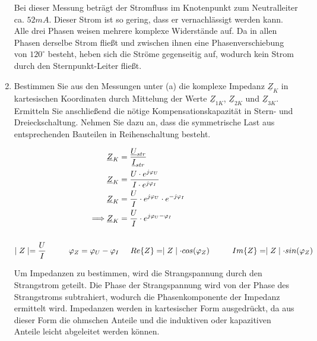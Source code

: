 \begin{enumerate}[label=\alph*)]
	 		
	 		Bei dieser Messung beträgt der Stromfluss im Knotenpunkt zum Neutralleiter ca. $52 mA$. Dieser Strom ist so gering, dass er vernachlässigt werden kann. Alle drei Phasen weisen mehrere komplexe Widerstände auf. Da in allen Phasen derselbe Strom fließt und zwischen ihnen eine Phasenverschiebung von $120^\circ$ besteht, heben sich die Ströme gegenseitig auf, wodurch kein Strom durch den Sternpunkt-Leiter fließt.
	 		
	 		\item Bestimmen Sie aus den Messungen unter (a) die komplexe Impedanz $\underline{Z}_{K}$ in kartesischen Koordinaten durch Mittelung der Werte $\underline{Z}_{1K}$, $\underline{Z}_{2K}$ und $\underline{Z}_{3K}$. Ermitteln Sie anschließend die nötige Kompensationskapazität in Stern- und Dreieckschaltung. Nehmen Sie dazu an, dass die symmetrische Last aus entsprechenden Bauteilen in Reihenschaltung besteht.
	 		
	 		\begin{align*}
	 			\underline{Z}_{K} &= \frac{\underline{U}_{str}}{\underline{I}_{str}}\\
	 			\underline{Z}_{K} &= \frac{U\cdot  e^{j\varphi_{U}}}{I\cdot  e^{j\varphi_{I}}}\\
	 			\underline{Z}_{K} &= \frac{U}{I} \cdot  e^{j\varphi_{U}}\cdot e^{-j\varphi_{I}}\\
	 			\Longrightarrow\underline{Z}_{K} &= \frac{U}{I} \cdot  e^{j{\varphi_{U} - \varphi_{I}}} \\ \ \\
	 			\mid Z \mid			= \frac{U}{I} \hspace{1cm}
	 			\varphi _{Z} 		= {\varphi_{U} - \varphi_{I}}
	 			&\hspace{0.5cm}
	 			Re\{Z\} 			= \mid Z \mid \cdot cos(\varphi_{Z}) \hspace{1cm}
	 			Im\{Z\} 			= \mid Z \mid \cdot sin(\varphi_{Z})\\
	 		\end{align*}
	 		
	 		Um Impedanzen zu bestimmen, wird die Strangspannung durch den Strangstrom geteilt. Die Phase der Strangspannung wird von der Phase des Strangstroms subtrahiert, wodurch die Phasenkomponente der Impedanz ermittelt wird. Impedanzen werden in kartesischer Form ausgedrückt, da aus dieser Form die ohmschen Anteile und die induktiven oder kapazitiven Anteile leicht abgeleitet werden können.
	 		

\end{enumerate}
